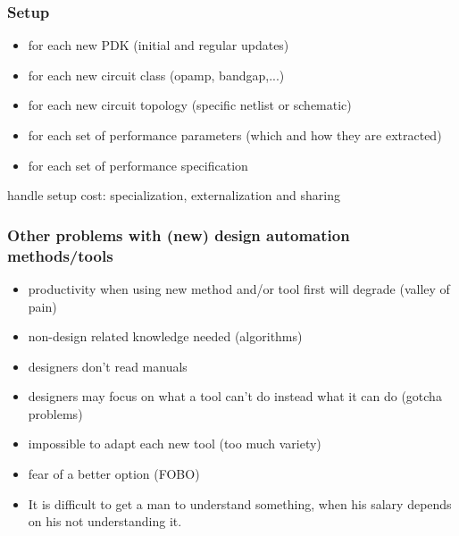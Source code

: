 \documentclass[10pt, aspectratio=169]{beamer}
\begin{document}
\begin{frame}
\frametitle{Setup}
\begin{itemize}
  \item for each new PDK (initial and regular updates)
  \item for each new circuit class (opamp, bandgap,...)
  \item for each new circuit topology (specific netlist or schematic)
  \item for each set of performance parameters (which and how they are extracted)
  \item for each set of performance specification
\end{itemize}

\vspace{5mm}

handle setup cost: specialization, externalization and sharing
\end{frame}

\begin{frame}
\frametitle{Other problems with (new) design automation methods/tools}

\begin{itemize}
  \item productivity when using new method and/or tool first 
    will degrade (valley of pain)

  \item non-design related knowledge needed (algorithms)

  \item designers don't read manuals

  \item designers may focus on what a tool can't do instead what it 
    can do (gotcha problems)

  \item impossible to adapt each new tool (too much variety)

  \item fear of a better option (FOBO)

  \item It is difficult to get a man to understand something, 
    when his salary depends on his not understanding it.
\end{itemize}
\end{frame}
\end{document}
